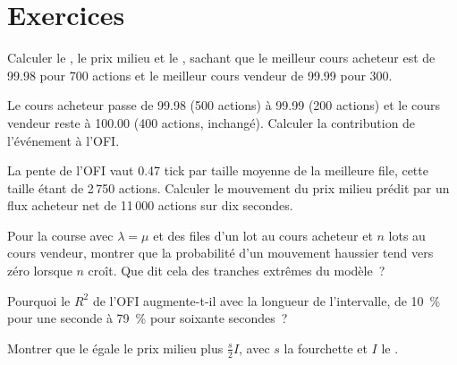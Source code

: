 \section{Exercices}

\begin{exercise}[$\star$]\label{exo:rs:order-book-features:1}
Calculer le , le prix milieu et le , sachant que le meilleur cours acheteur est de 99.98 pour 700 actions et le meilleur cours vendeur de 99.99 pour 300.
\end{exercise}

\begin{exercise}[$\star$]\label{exo:rs:order-book-features:2}
Le cours acheteur passe de 99.98 (500 actions) à 99.99 (200 actions) et le cours vendeur reste à 100.00 (400 actions, inchangé).
Calculer la contribution de l'événement à l'OFI.
\end{exercise}

\begin{exercise}[$\star$]\label{exo:rs:order-book-features:3}
La pente de l'OFI vaut 0.47 tick par taille moyenne de la meilleure file, cette taille étant de 2\,750 actions. Calculer le mouvement du prix milieu prédit par un flux acheteur net de 11\,000
actions sur dix secondes.
\end{exercise}

\begin{exercise}[$\star\star$]\label{exo:rs:order-book-features:4}
Pour la course avec $\lambda = \mu$ et des files d'un lot au cours acheteur et $n$ lots au cours vendeur, montrer que la probabilité d'un mouvement haussier tend vers
zéro lorsque $n$ croît. Que dit cela des tranches extrêmes du modèle~?
\end{exercise}

\begin{exercise}[$\star\star$]\label{exo:rs:order-book-features:5}
Pourquoi le $R^2$ de l'OFI augmente-t-il avec la longueur de l'intervalle, de 10~\% pour une seconde à 79~\% pour soixante secondes~?
\end{exercise}

\begin{exercise}[$\star\star$]\label{exo:rs:order-book-features:6}
Montrer que le  égale le prix milieu plus $\tfrac s2 I$, avec $s$ la fourchette et $I$ le .
\end{exercise}

